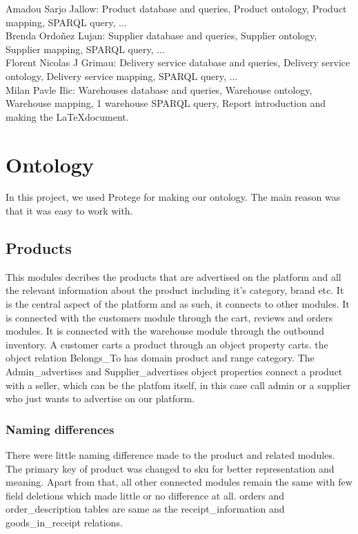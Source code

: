 \documentclass{article}
\begin{document}
\noindent Amadou Sarjo Jallow: Product database and queries, Product ontology, Product mapping, SPARQL query, ...
\\

\noindent Brenda Ordoñez Lujan: Supplier database and queries, Supplier ontology, Supplier mapping, SPARQL query, ...
\\

\noindent Florent Nicolas J Grimau: Delivery service database and queries, Delivery service ontology, Delivery service mapping, SPARQL query, ...
\\

\noindent Milan Pavle Ilic: Warehouses database and queries, Warehouse ontology, Warehouse mapping, 1 warehouse SPARQL query, Report introduction and making the \LaTeX document.



\section{Ontology}
In this project, we used Protege for making our ontology. The main reason was that it was easy to work with.


\subsection{Products}
This modules decribes the products that are advertised on the platform and all the relevant information about the product including it's category, brand etc. It is the central aspect of the platform and as such, it connects to other modules. It is connected with the customers module through the cart, reviews and orders modules. It is connected with the warehouse module through the outbound inventory. A customer carts a product through an object property carts. the object relation Belongs\_To has domain product and range category. The Admin\_advertises and Supplier\_advertises object properties connect a product with a seller, which can be the platfom itself, in this case call admin or a supplier who just wants to advertise on our platform.

\subsubsection{Naming differences}
There were little naming difference made to the product and related modules. The primary key of product was changed to sku for better representation and meaning. Apart from that, all other connected modules remain the same with few field deletions which made little or no difference at all. orders and order\_description tables are same as the receipt\_information and goods\_in\_receipt relations.
\end{document}
